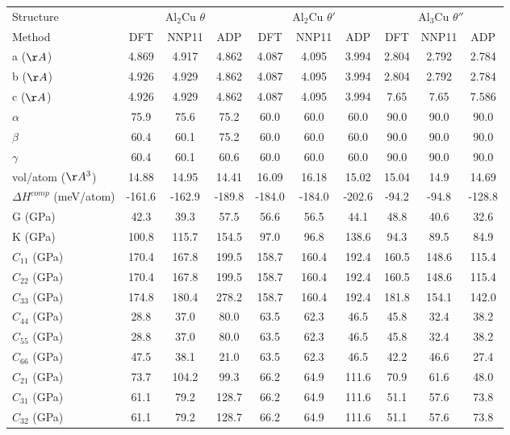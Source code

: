 \documentclass{article}
\begin{document}
\begin{tabular}{l|ccc|ccc|ccc}%
\hline%
Structure&\multicolumn{3}{c}{Al$_2$Cu  $\theta$}&\multicolumn{3}{c}{Al$_2$Cu $\theta'$}&\multicolumn{3}{c}{Al$_3$Cu $\theta''$}\\%
Method&DFT&NNP11&ADP&DFT&NNP11&ADP&DFT&NNP11&ADP\\%
\hline%
a ($\AA$)&4.869&4.917&4.862&4.087&4.095&3.994&2.804&2.792&2.784\\%
b ($\AA$)&4.926&4.929&4.862&4.087&4.095&3.994&2.804&2.792&2.784\\%
c ($\AA$)&4.926&4.929&4.862&4.087&4.095&3.994&7.65&7.65&7.586\\%
$\alpha$&75.9&75.6&75.2&60.0&60.0&60.0&90.0&90.0&90.0\\%
$\beta$&60.4&60.1&75.2&60.0&60.0&60.0&90.0&90.0&90.0\\%
$\gamma$&60.4&60.1&60.6&60.0&60.0&60.0&90.0&90.0&90.0\\%
vol/atom ($\AA^3$)&14.88&14.95&14.41&16.09&16.18&15.02&15.04&14.9&14.69\\%
$\Delta$$H^{comp}$ (meV/atom)&{-}161.6&{-}162.9&{-}189.8&{-}184.0&{-}184.0&{-}202.6&{-}94.2&{-}94.8&{-}128.8\\%
G (GPa)&42.3&39.3&57.5&56.6&56.5&44.1&48.8&40.6&32.6\\%
K (GPa)&100.8&115.7&154.5&97.0&96.8&138.6&94.3&89.5&84.9\\%
$C_{11}$ (GPa)&170.4&167.8&199.5&158.7&160.4&192.4&160.5&148.6&115.4\\%
$C_{22}$ (GPa)&170.4&167.8&199.5&158.7&160.4&192.4&160.5&148.6&115.4\\%
$C_{33}$ (GPa)&174.8&180.4&278.2&158.7&160.4&192.4&181.8&154.1&142.0\\%
$C_{44}$ (GPa)&28.8&37.0&80.0&63.5&62.3&46.5&45.8&32.4&38.2\\%
$C_{55}$ (GPa)&28.8&37.0&80.0&63.5&62.3&46.5&45.8&32.4&38.2\\%
$C_{66}$ (GPa)&47.5&38.1&21.0&63.5&62.3&46.5&42.2&46.6&27.4\\%
$C_{21}$ (GPa)&73.7&104.2&99.3&66.2&64.9&111.6&70.9&61.6&48.0\\%
$C_{31}$ (GPa)&61.1&79.2&128.7&66.2&64.9&111.6&51.1&57.6&73.8\\%
$C_{32}$ (GPa)&61.1&79.2&128.7&66.2&64.9&111.6&51.1&57.6&73.8\\%
\hline%
\end{tabular}%
\end{document}
